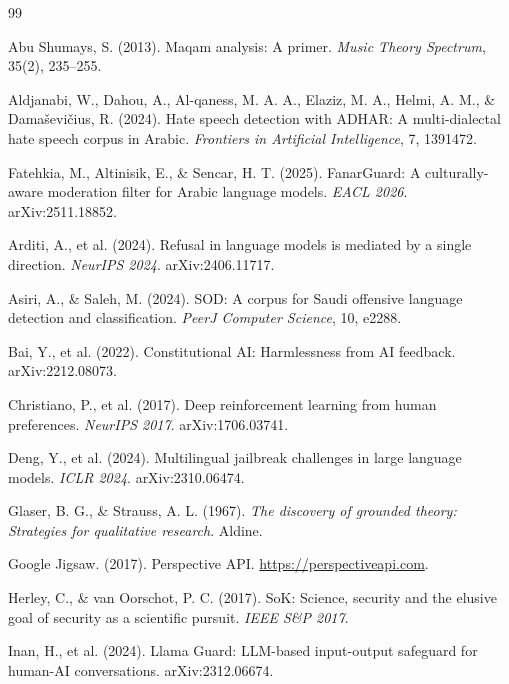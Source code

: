 \documentclass[11pt,a4paper]{article}
\begin{document}
\begin{thebibliography}{99}

Abu Shumays, S. (2013).
Maqam analysis: A primer.
\textit{Music Theory Spectrum}, 35(2), 235--255.

Aldjanabi, W., Dahou, A., Al-qaness, M. A. A., Elaziz, M. A., Helmi, A. M., \& Damaševičius, R. (2024).
Hate speech detection with ADHAR: A multi-dialectal hate speech corpus in Arabic.
\textit{Frontiers in Artificial Intelligence}, 7, 1391472.

Fatehkia, M., Altinisik, E., \& Sencar, H. T. (2025).
FanarGuard: A culturally-aware moderation filter for Arabic language models.
\textit{EACL 2026}. arXiv:2511.18852.

Arditi, A., et al. (2024).
Refusal in language models is mediated by a single direction.
\textit{NeurIPS 2024}. arXiv:2406.11717.

Asiri, A., \& Saleh, M. (2024).
SOD: A corpus for Saudi offensive language detection and classification.
\textit{PeerJ Computer Science}, 10, e2288.

Bai, Y., et al. (2022).
Constitutional AI: Harmlessness from AI feedback.
arXiv:2212.08073.

Christiano, P., et al. (2017).
Deep reinforcement learning from human preferences.
\textit{NeurIPS 2017}. arXiv:1706.03741.

Deng, Y., et al. (2024).
Multilingual jailbreak challenges in large language models.
\textit{ICLR 2024}. arXiv:2310.06474.

Glaser, B. G., \& Strauss, A. L. (1967).
\textit{The discovery of grounded theory: Strategies for qualitative research}.
Aldine.

Google Jigsaw. (2017).
Perspective API.
\url{https://perspectiveapi.com}.

Herley, C., \& van Oorschot, P. C. (2017).
SoK: Science, security and the elusive goal of security as a scientific pursuit.
\textit{IEEE S\&P 2017}.

Inan, H., et al. (2024).
Llama Guard: LLM-based input-output safeguard for human-AI conversations.
arXiv:2312.06674.


\end{thebibliography}
\end{document}
